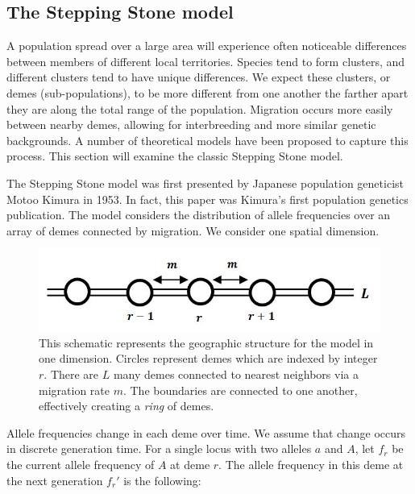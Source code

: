 \subsection{The Stepping Stone model}

A population spread over a large area will experience often noticeable differences between members of different local territories. Species tend to form clusters, and different clusters tend to have unique differences. We expect these clusters, or demes (sub-populations), to be more different from one another the farther apart they are along the total range of the population. Migration occurs more easily between nearby demes, allowing for interbreeding and more similar genetic  backgrounds. A number of theoretical models have been proposed to capture this process.\cite{wright_differential_1945} \cite{malecot_heterozygosity_1975} This section will examine the classic Stepping Stone model. 

The Stepping Stone model was first presented by Japanese population geneticist Motoo Kimura in 1953. \cite{kimura_stepping_1953} In fact, this paper was Kimura's first population genetics publication. \cite{crow_motoo_1997} The model considers the distribution of allele frequencies over an array of demes connected by migration. We consider one spatial dimension. 

\begin{figure}[h]
    \centering
    \includegraphics[scale=0.8]{img/model_schematic.JPG}
    \caption{This schematic represents the geographic structure for the model in one dimension. Circles represent demes which are indexed by integer $r$. There are $L$ many demes connected to nearest neighbors via a migration rate $m$. The boundaries are connected to one another, effectively creating a \textit{ring} of demes.}
    \label{fig:schematic}
\end{figure}


Allele frequencies change in each deme over time. We assume that change occurs in discrete generation time. For a single locus with two alleles $a$ and $A$, let $f_r$ be the current allele frequency of $A$ at deme $r$. The allele frequency in this deme at the next generation $f_r'$ is the following:

